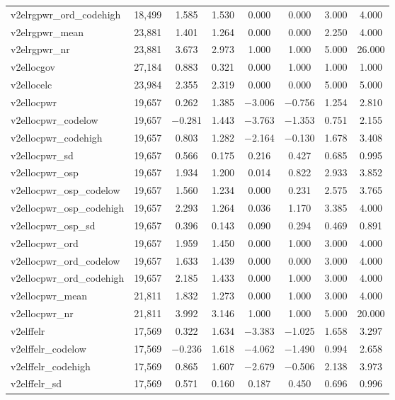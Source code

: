 \begin{table}[!htbp]
\begin{tabular}{@{\extracolsep{5pt}}lccccccc}
v2elrgpwr\_ord\_codehigh & 18,499 & 1.585 & 1.530 & 0.000 & 0.000 & 3.000 & 4.000 \\ 
v2elrgpwr\_mean & 23,881 & 1.401 & 1.264 & 0.000 & 0.000 & 2.250 & 4.000 \\ 
v2elrgpwr\_nr & 23,881 & 3.673 & 2.973 & 1.000 & 1.000 & 5.000 & 26.000 \\ 
v2ellocgov & 27,184 & 0.883 & 0.321 & 0.000 & 1.000 & 1.000 & 1.000 \\ 
v2ellocelc & 23,984 & 2.355 & 2.319 & 0.000 & 0.000 & 5.000 & 5.000 \\ 
v2ellocpwr & 19,657 & 0.262 & 1.385 & $-$3.006 & $-$0.756 & 1.254 & 2.810 \\ 
v2ellocpwr\_codelow & 19,657 & $-$0.281 & 1.443 & $-$3.763 & $-$1.353 & 0.751 & 2.155 \\ 
v2ellocpwr\_codehigh & 19,657 & 0.803 & 1.282 & $-$2.164 & $-$0.130 & 1.678 & 3.408 \\ 
v2ellocpwr\_sd & 19,657 & 0.566 & 0.175 & 0.216 & 0.427 & 0.685 & 0.995 \\ 
v2ellocpwr\_osp & 19,657 & 1.934 & 1.200 & 0.014 & 0.822 & 2.933 & 3.852 \\ 
v2ellocpwr\_osp\_codelow & 19,657 & 1.560 & 1.234 & 0.000 & 0.231 & 2.575 & 3.765 \\ 
v2ellocpwr\_osp\_codehigh & 19,657 & 2.293 & 1.264 & 0.036 & 1.170 & 3.385 & 4.000 \\ 
v2ellocpwr\_osp\_sd & 19,657 & 0.396 & 0.143 & 0.090 & 0.294 & 0.469 & 0.891 \\ 
v2ellocpwr\_ord & 19,657 & 1.959 & 1.450 & 0.000 & 1.000 & 3.000 & 4.000 \\ 
v2ellocpwr\_ord\_codelow & 19,657 & 1.633 & 1.439 & 0.000 & 0.000 & 3.000 & 4.000 \\ 
v2ellocpwr\_ord\_codehigh & 19,657 & 2.185 & 1.433 & 0.000 & 1.000 & 3.000 & 4.000 \\ 
v2ellocpwr\_mean & 21,811 & 1.832 & 1.273 & 0.000 & 1.000 & 3.000 & 4.000 \\ 
v2ellocpwr\_nr & 21,811 & 3.992 & 3.146 & 1.000 & 1.000 & 5.000 & 20.000 \\ 
v2elffelr & 17,569 & 0.322 & 1.634 & $-$3.383 & $-$1.025 & 1.658 & 3.297 \\ 
v2elffelr\_codelow & 17,569 & $-$0.236 & 1.618 & $-$4.062 & $-$1.490 & 0.994 & 2.658 \\ 
v2elffelr\_codehigh & 17,569 & 0.865 & 1.607 & $-$2.679 & $-$0.506 & 2.138 & 3.973 \\ 
v2elffelr\_sd & 17,569 & 0.571 & 0.160 & 0.187 & 0.450 & 0.696 & 0.996 \\ 

\end{tabular}
\end{table}
